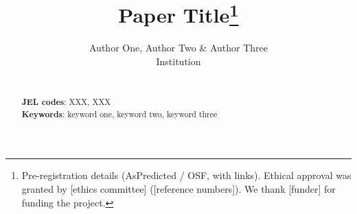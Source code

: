 \documentclass[12pt]{article}
\begin{document}
\title{Paper Title\thanks{%
Pre-registration details (AsPredicted / OSF, with links).
Ethical approval was granted by [ethics committee] ([reference numbers]).
We thank [funder] for funding the project.}}


\author{
Author One, Author Two \& Author Three\\[0.5em]
\small Institution
}

\maketitle

\noindent
\begin{abstract}
\begin{singlespace}
 \\

\noindent \textbf{JEL codes}: XXX, XXX \\
\noindent \textbf{Keywords}: keyword one, keyword two, keyword three
\end{singlespace}
\end{abstract}


\newpage








\newpage



\newpage
\appendix
\renewcommand{\thefigure}{\thesection.\arabic{figure}}
\renewcommand{\thetable}{\thesection.\arabic{table}}

\newpage
\setcounter{figure}{0}
\setcounter{table}{0}


\newpage
\setcounter{figure}{0}
\setcounter{table}{0}


% 
\end{document}
